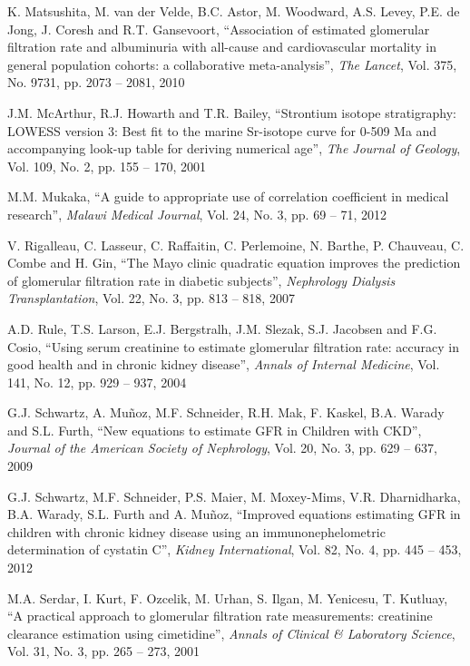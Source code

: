 \documentclass[10pt,final]{siamltex}
\begin{document}
\begin{thebibliography}{99}
   K. Matsushita, M. van der Velde, B.C. Astor, M. Woodward, A.S. Levey, P.E. de Jong, J. Coresh and R.T. Gansevoort, ``Association of estimated glomerular filtration rate and albuminuria with all-cause and cardiovascular mortality in general population cohorts: a collaborative meta-analysis'', \textit{The Lancet}, Vol. 375, No. 9731, pp. 2073 -- 2081, 2010

   J.M. McArthur, R.J. Howarth and T.R. Bailey, ``Strontium isotope stratigraphy: LOWESS version 3: Best fit to the marine Sr-isotope curve for 0-509 Ma and accompanying look-up table for deriving numerical age'', \textit{The Journal of Geology}, Vol. 109, No. 2, pp. 155 -- 170, 2001

   M.M. Mukaka, ``A guide to appropriate use of correlation coefficient in medical research'', \textit{Malawi Medical Journal}, Vol. 24, No. 3, pp. 69 -- 71, 2012

   V. Rigalleau, C. Lasseur, C. Raffaitin, C. Perlemoine, N. Barthe, P. Chauveau, C. Combe and H. Gin, ``The Mayo clinic quadratic equation improves the prediction of glomerular filtration rate in diabetic subjects'', \textit{Nephrology Dialysis Transplantation}, Vol. 22, No. 3, pp. 813 -- 818, 2007

   A.D. Rule, T.S. Larson, E.J. Bergstralh, J.M. Slezak, S.J. Jacobsen and F.G. Cosio, ``Using serum creatinine to estimate glomerular filtration rate: accuracy in good health and in chronic kidney disease'', \textit{Annals of Internal Medicine}, Vol. 141, No. 12, pp. 929 -- 937, 2004

   G.J. Schwartz, A. Mu\~{n}oz, M.F. Schneider, R.H. Mak, F. Kaskel, B.A. Warady and S.L. Furth, ``New equations to estimate GFR in Children with CKD'', \textit{Journal of the American Society of Nephrology}, Vol. 20, No. 3, pp. 629 -- 637, 2009

   G.J. Schwartz, M.F. Schneider, P.S. Maier, M. Moxey-Mims, V.R. Dharnidharka, B.A. Warady, S.L. Furth and A. Mu\~{n}oz, ``Improved equations estimating GFR in children with chronic kidney disease using an immunonephelometric determination of cystatin C'', \textit{Kidney International}, Vol. 82, No. 4, pp. 445 -- 453, 2012

   M.A. Serdar, I. Kurt, F. Ozcelik, M. Urhan, S. Ilgan, M. Yenicesu, T. Kutluay, ``A practical approach to glomerular filtration rate measurements: creatinine clearance estimation using cimetidine'', \textit{Annals of Clinical \& Laboratory Science}, Vol. 31, No. 3, pp. 265 -- 273, 2001


\end{thebibliography}
\end{document}
